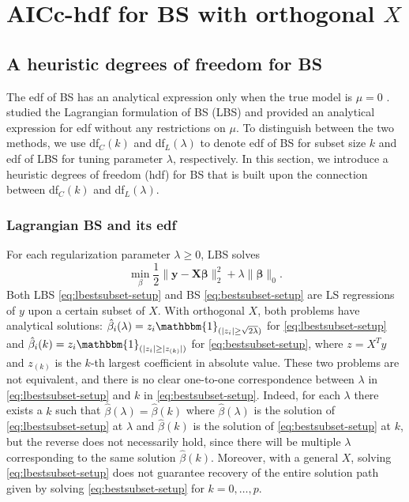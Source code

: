 \section{AICc-hdf for BS with orthogonal \texorpdfstring{$X$}{Lg}}
\label{sec:aicc_hdf}
\subsection{A heuristic degrees of freedom for BS}
The edf of BS has an analytical expression only when the true model is $\mu=0$ \citep{Ye1998}. \citet{Tibshirani2015} studied the Lagrangian formulation of BS (LBS) and provided an analytical expression for edf without any restrictions on $\mu$. To distinguish between the two methods, we use df$_C(k)$ and df$_L(\lambda)$ to denote edf of BS for subset size $k$ and edf of LBS for tuning parameter $\lambda$, respectively. In this section, we introduce a heuristic degrees of freedom (hdf) for BS that is built upon the connection between df$_C(k)$ and df$_L(\lambda)$.

\subsubsection{Lagrangian BS and its edf}
For each regularization parameter $\lambda \ge 0$, LBS solves
\begin{equation}
	\min_\beta \frac{1}{2} \lVert \mathbf{y}-\mathbf{X\beta}\rVert_2^2 + \lambda\lVert \mathbf{\beta} \rVert_0.
\label{eq:lbestsubset-setup}
\end{equation} 
Both LBS \eqref{eq:lbestsubset-setup} and BS \eqref{eq:bestsubset-setup} are LS regressions of $y$ upon a certain subset of $X$. With orthogonal $X$, both problems have analytical solutions: $\hat{\beta}_i(\lambda)=z_i \mathbbm{1}_{(|z_{i}| \ge \sqrt{2\lambda})}$ for \eqref{eq:lbestsubset-setup} and $\hat{\beta}_i(k)=z_i \mathbbm{1}_{(|z_{i}| \ge |z_{(k)}|)}$ for \eqref{eq:bestsubset-setup}, where $z=X^T y$ and $z_{(k)}$ is the $k$-th largest coefficient in absolute value. These two problems are not equivalent, and there is no clear one-to-one correspondence between $\lambda$ in \eqref{eq:lbestsubset-setup} and $k$ in \eqref{eq:bestsubset-setup}. Indeed, for each $\lambda$ there exists a $k$ such that $\hat{\beta}(\lambda) = \hat{\beta}(k)$ where $\hat{\beta}(\lambda)$ is the solution of \eqref{eq:lbestsubset-setup} at $\lambda$ and $\hat{\beta}(k)$ is the solution of \eqref{eq:bestsubset-setup} at $k$, but the reverse does not necessarily hold, since there will be multiple $\lambda$ corresponding to the same solution $\hat{\beta}(k)$. Moreover, with a general $X$, solving \eqref{eq:lbestsubset-setup} does not guarantee recovery of the entire solution path given by solving \eqref{eq:bestsubset-setup} for $k=0,\dots,p$.

